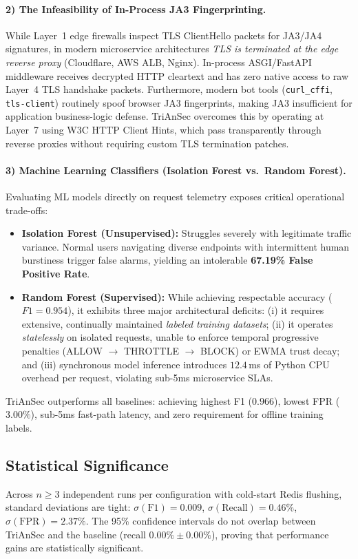 \documentclass[journal,10pt]{IEEEtran}
\begin{document}
\begin{table}[!t]
\paragraph{2) The Infeasibility of In-Process JA3 Fingerprinting.}
While Layer~1 edge firewalls inspect TLS ClientHello packets for JA3/JA4 signatures, in modern microservice architectures \emph{TLS is terminated at the edge reverse proxy} (Cloudflare, AWS ALB, Nginx). In-process ASGI/FastAPI middleware receives decrypted HTTP cleartext and has zero native access to raw Layer~4 TLS handshake packets. Furthermore, modern bot tools (\texttt{curl\_cffi}, \texttt{tls-client}) routinely spoof browser JA3 fingerprints, making JA3 insufficient for application business-logic defense. TriAnSec overcomes this by operating at Layer~7 using W3C HTTP Client Hints, which pass transparently through reverse proxies without requiring custom TLS termination patches.

\paragraph{3) Machine Learning Classifiers (Isolation Forest vs.\ Random Forest).}
Evaluating ML models directly on request telemetry exposes critical operational trade-offs:
\begin{itemize}
    \item \textbf{Isolation Forest (Unsupervised):} Struggles severely with legitimate traffic variance. Normal users navigating diverse endpoints with intermittent human burstiness trigger false alarms, yielding an intolerable \textbf{67.19\% False Positive Rate}.
    \item \textbf{Random Forest (Supervised):} While achieving respectable accuracy ($F1 = 0.954$), it exhibits three major architectural deficits: (i) it requires extensive, continually maintained \emph{labeled training datasets}; (ii) it operates \emph{statelessly} on isolated requests, unable to enforce temporal progressive penalties (ALLOW $\to$ THROTTLE $\to$ BLOCK) or EWMA trust decay; and (iii) synchronous model inference introduces $12.4$\,ms of Python CPU overhead per request, violating sub-5ms microservice SLAs.
\end{itemize}
TriAnSec outperforms all baselines: achieving highest F1 ($0.966$), lowest FPR ($3.00\%$), sub-5ms fast-path latency, and zero requirement for offline training labels.

\subsection{Statistical Significance}
Across $n\!\ge\!3$ independent runs per configuration with cold-start Redis flushing, standard deviations are tight: $\sigma(\mathrm{F1}){=}0.009$, $\sigma(\mathrm{Recall}){=}0.46\%$, $\sigma(\mathrm{FPR}){=}2.37\%$. The 95\% confidence intervals do not overlap between TriAnSec and the baseline (recall $0.00\%\pm0.00\%$), proving that performance gains are statistically significant.


\end{table}
\end{document}
